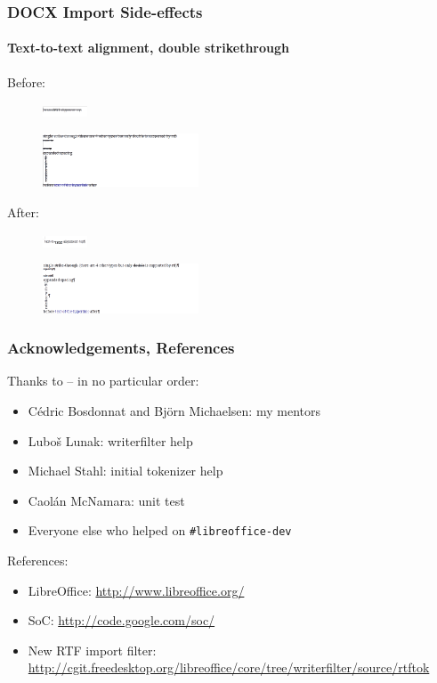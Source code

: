 \documentclass{beamer}
\begin{document}
\begin{frame}
\frametitle{DOCX Import Side-effects}
\framesubtitle{Text-to-text alignment, double strikethrough}
Before:
\begin{figure}[H]
\includegraphics[width=50px,keepaspectratio]{pic/docx-text-to-text-old.png}
\end{figure}
\begin{figure}[H]
\includegraphics[width=175px,keepaspectratio]{pic/docx-strike-old.png}
\end{figure}
After:
\begin{figure}[H]
\includegraphics[width=50px,keepaspectratio]{pic/docx-text-to-text-new.png}
\end{figure}
\begin{figure}[H]
\includegraphics[width=175px,keepaspectratio]{pic/docx-strike-new.png}
\end{figure}
\end{frame}

\begin{frame}
\frametitle{Acknowledgements, References}
Thanks to -- in no particular order:
\begin{itemize}
\item C\'{e}dric Bosdonnat and Bj\"{o}rn Michaelsen: my mentors
\item Lubo\v{s} Lunak: writerfilter help
\item Michael Stahl: initial tokenizer help
\item Caol\'{a}n McNamara: unit test
\item Everyone else who helped on \texttt{\#libreoffice-dev}
\end{itemize}

References:
\begin{itemize}
\item LibreOffice: \url{http://www.libreoffice.org/}
\item SoC: \url{http://code.google.com/soc/}
\item New RTF import filter: \url{http://cgit.freedesktop.org/libreoffice/core/tree/writerfilter/source/rtftok}
\end{itemize}
\end{frame}
\end{document}
